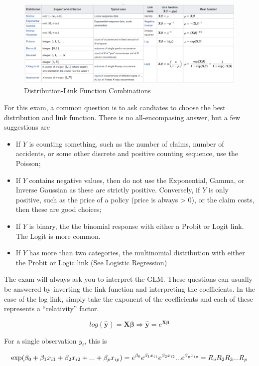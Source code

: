 \documentclass[]{book}
\providecommand{\tightlist}{%
  \setlength{\itemsep}{0pt}\setlength{\parskip}{0pt}}
\begin{document}
\begin{figure}
\includegraphics[width=22.32in]{images/glm_links} \caption{Distribution-Link Function Combinations}\label{fig:unnamed-chunk-90}
\end{figure}

For this exam, a common question is to ask candiates to choose the best distribution and link function. There is no all-encompasing answer, but a few suggestions are

\begin{itemize}
\tightlist
\item
  If \(Y\) is counting something, such as the number of claims, number of accidents, or some other discrete and positive counting sequence, use the Poisson;
\item
  If \(Y\) contains negative values, then do not use the Exponential, Gamma, or Inverse Gaussian as these are strictly positive. Conversely, if \(Y\) is only positive, such as the price of a policy (price is always \textgreater{} 0), or the claim costs, then these are good choices;
\item
  If \(Y\) is binary, the the binomial response with either a Probit or Logit link. The Logit is more common.
\item
  If \(Y\) has more than two categories, the multinomial distribution with either the Probit or Logic link (See Logistic Regression)
\end{itemize}

The exam will always ask you to interpret the GLM. These questions can usually be answered by inverting the link function and interpreting the coefficients. In the case of the log link, simply take the exponent of the coefficients and each of these represents a ``relativity'' factor.

\[
log(\mathbf{\hat{y}}) = \mathbf{X} \mathbf{\beta} \Rightarrow \mathbf{\hat{y}} = e^{\mathbf{X} \mathbf{\beta}}
\]

For a single observation \(y_i\), this is

\[
\text{exp}(\beta_0 + \beta_1 x_{i1} + \beta_2 x_{i2} + ... + \beta_p x_{ip}) = \\
e^{\beta_0} e^{\beta_1 x_{i1}}e^{\beta_2 x_{i2}} ...  e^{\beta_p x_{ip}} = 
R_o R_2 R_3 ... R_{p}
\]
\end{document}
